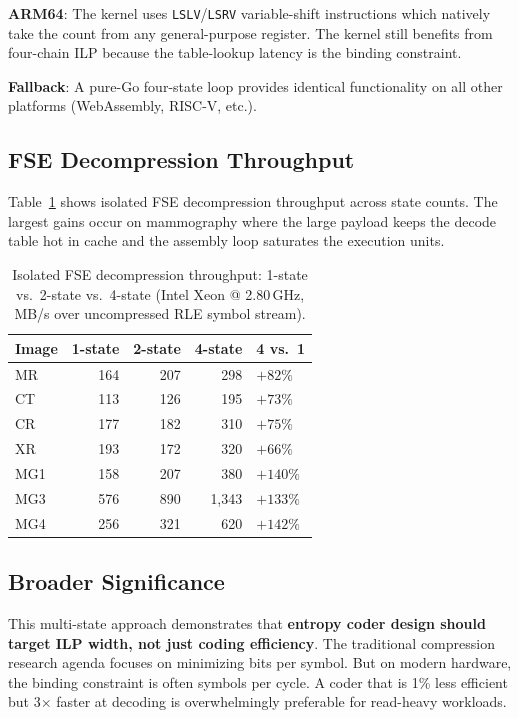 \documentclass[10pt,twocolumn]{article}
\begin{document}
\textbf{ARM64}: The kernel uses \texttt{LSLV}/\texttt{LSRV} variable-shift instructions which natively take the count from any general-purpose register. The kernel still benefits from four-chain ILP because the table-lookup latency is the binding constraint.

\textbf{Fallback}: A pure-Go four-state loop provides identical functionality on all other platforms (WebAssembly, RISC-V, etc.).

\subsection{FSE Decompression Throughput}

Table~\ref{tab:fsethroughput} shows isolated FSE decompression throughput across state counts. The largest gains occur on mammography where the large payload keeps the decode table hot in cache and the assembly loop saturates the execution units.

\begin{table}[h]
  \centering
  \caption{Isolated FSE decompression throughput: 1-state vs.\ 2-state vs.\ 4-state (Intel Xeon @ 2.80\,GHz, MB/s over uncompressed RLE symbol stream).}
  \label{tab:fsethroughput}
  \small
  \begin{tabular}{lrrrl}
    \toprule
    Image & 1-state & 2-state & 4-state & 4 vs.\ 1 \\
    \midrule
    MR  & 164 & 207 &   298 & $+82\%$ \\
    CT  & 113 & 126 &   195 & $+73\%$ \\
    CR  & 177 & 182 &   310 & $+75\%$ \\
    XR  & 193 & 172 &   320 & $+66\%$ \\
    MG1 & 158 & 207 &   380 & $+140\%$ \\
    MG3 & 576 & 890 & 1,343 & $+133\%$ \\
    MG4 & 256 & 321 &   620 & $+142\%$ \\
    \bottomrule
  \end{tabular}
\end{table}

\subsection{Broader Significance}

This multi-state approach demonstrates that \textbf{entropy coder design should target ILP width, not just coding efficiency}. The traditional compression research agenda focuses on minimizing bits per symbol. But on modern hardware, the binding constraint is often symbols per cycle. A coder that is 1\% less efficient but 3$\times$ faster at decoding is overwhelmingly preferable for read-heavy workloads.
\end{document}
